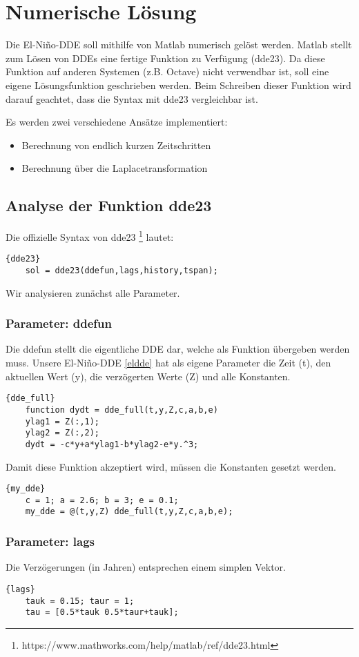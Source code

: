 \section{Numerische Lösung}

Die El-Niño-DDE soll mithilfe von Matlab numerisch gelöst werden.
Matlab stellt zum Lösen von DDEs eine fertige Funktion zu Verfügung (dde23).
Da diese Funktion auf anderen Systemen (z.B. Octave) nicht verwendbar ist, soll eine eigene Lösungsfunktion geschrieben werden.
Beim Schreiben dieser Funktion wird darauf geachtet, dass die Syntax mit dde23 vergleichbar ist. 

Es werden zwei verschiedene Ansätze implementiert: 
\begin{itemize}
	\item Berechnung von endlich kurzen Zeitschritten
	\item Berechnung über die Laplacetransformation
\end{itemize}

\subsection{Analyse der Funktion dde23}
Die offizielle Syntax von dde23 \footnote{https://www.mathworks.com/help/matlab/ref/dde23.html} lautet: 
\begin{lstlisting}{dde23}
	sol = dde23(ddefun,lags,history,tspan);
\end{lstlisting}
Wir analysieren zunächst alle Parameter.

\subsubsection{Parameter: ddefun}
Die ddefun stellt die eigentliche DDE dar, welche als Funktion übergeben werden muss.
Unsere El-Niño-DDE \ref{eldde} hat als eigene Parameter die Zeit (t), den aktuellen Wert (y), die verzögerten Werte (Z) und alle Konstanten.
\begin{lstlisting}{dde_full}
	function dydt = dde_full(t,y,Z,c,a,b,e)
	ylag1 = Z(:,1);
	ylag2 = Z(:,2);
	dydt = -c*y+a*ylag1-b*ylag2-e*y.^3;
\end{lstlisting}
Damit diese Funktion akzeptiert wird, müssen die Konstanten gesetzt werden.
\begin{lstlisting}{my_dde}
	c = 1; a = 2.6; b = 3; e = 0.1;
	my_dde = @(t,y,Z) dde_full(t,y,Z,c,a,b,e);
\end{lstlisting}

\subsubsection{Parameter: lags}
Die Verzögerungen (in Jahren) entsprechen einem simplen Vektor.
\begin{lstlisting}{lags}
	tauk = 0.15; taur = 1;
	tau = [0.5*tauk 0.5*taur+tauk];
\end{lstlisting}

